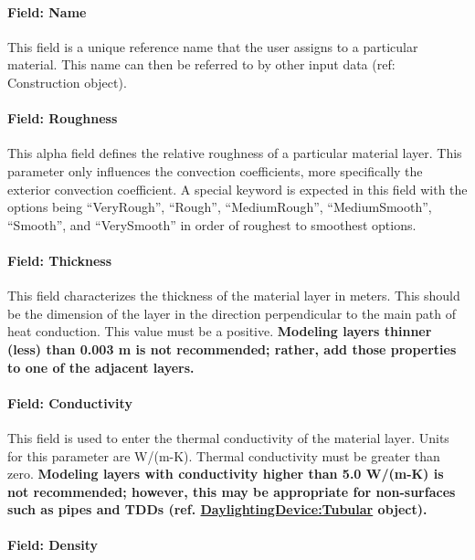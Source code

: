 \paragraph{Field: Name}\label{field-name-045}

This field is a unique reference name that the user assigns to a particular material. This name can then be referred to by other input data (ref: Construction object).

\paragraph{Field: Roughness}\label{field-roughness-000}

This alpha field defines the relative roughness of a particular material layer. This parameter only influences the convection coefficients, more specifically the exterior convection coefficient. A special keyword is expected in this field with the options being ``VeryRough'', ``Rough'', ``MediumRough'', ``MediumSmooth'', ``Smooth'', and ``VerySmooth'' in order of roughest to smoothest options.

\paragraph{Field: Thickness}\label{field-thickness}

This field characterizes the thickness of the material layer in meters. This should be the dimension of the layer in the direction perpendicular to the main path of heat conduction. This value must be a positive. \textbf{Modeling layers thinner (less) than 0.003 m is not recommended; rather, add those properties to one of the adjacent layers.}

\paragraph{Field: Conductivity}\label{field-conductivity}

This field is used to enter the thermal conductivity of the material layer. Units for this parameter are W/(m-K). Thermal conductivity must be greater than zero. \textbf{Modeling layers with conductivity higher than 5.0 W/(m-K) is not recommended; however, this may be appropriate for non-surfaces such as pipes and TDDs (ref. \hyperref[daylightingdevicetubular]{DaylightingDevice:Tubular} object).}

\paragraph{Field: Density}\label{field-density}

